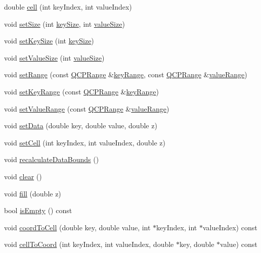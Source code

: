 \begin{DoxyCompactItemize}
double \hyperlink{class_q_c_p_color_map_data_af51ecd21f347adbf87b4cce4e1f5cbd6}{cell} (int key\+Index, int value\+Index)
\item 
void \hyperlink{class_q_c_p_color_map_data_a0d9ff35c299d0478b682bfbcdd9c097e}{set\+Size} (int \hyperlink{class_q_c_p_color_map_data_aa8d7811686fdfea964947715210c4af8}{key\+Size}, int \hyperlink{class_q_c_p_color_map_data_ab880be6bc587f34e8d22fe77ef6b57e9}{value\+Size})
\item 
void \hyperlink{class_q_c_p_color_map_data_ac7ef70e383aface34b44dbde49234b6b}{set\+Key\+Size} (int \hyperlink{class_q_c_p_color_map_data_aa8d7811686fdfea964947715210c4af8}{key\+Size})
\item 
void \hyperlink{class_q_c_p_color_map_data_a0893c9e3914513048b45e3429ffd16f2}{set\+Value\+Size} (int \hyperlink{class_q_c_p_color_map_data_ab880be6bc587f34e8d22fe77ef6b57e9}{value\+Size})
\item 
void \hyperlink{class_q_c_p_color_map_data_aad9c1c7c703c1339489fc730517c83d4}{set\+Range} (const \hyperlink{class_q_c_p_range}{Q\+C\+P\+Range} \&\hyperlink{class_q_c_p_color_map_data_a4765180639742460f64ab6c97c745c08}{key\+Range}, const \hyperlink{class_q_c_p_range}{Q\+C\+P\+Range} \&\hyperlink{class_q_c_p_color_map_data_a025be4d7ba0494fd7b38a5a56c737f2a}{value\+Range})
\item 
void \hyperlink{class_q_c_p_color_map_data_a0738c485f3c9df9ea1241b7a8bb6a86e}{set\+Key\+Range} (const \hyperlink{class_q_c_p_range}{Q\+C\+P\+Range} \&\hyperlink{class_q_c_p_color_map_data_a4765180639742460f64ab6c97c745c08}{key\+Range})
\item 
void \hyperlink{class_q_c_p_color_map_data_ada1b2680ba96a5f4175b6d341cf75d23}{set\+Value\+Range} (const \hyperlink{class_q_c_p_range}{Q\+C\+P\+Range} \&\hyperlink{class_q_c_p_color_map_data_a025be4d7ba0494fd7b38a5a56c737f2a}{value\+Range})
\item 
void \hyperlink{class_q_c_p_color_map_data_afd2083ccfd6987ec94aa7ef8e91ca39a}{set\+Data} (double key, double value, double z)
\item 
void \hyperlink{class_q_c_p_color_map_data_a8e75eaf8746596319032a93f3d2d0683}{set\+Cell} (int key\+Index, int value\+Index, double z)
\item 
void \hyperlink{class_q_c_p_color_map_data_ab235ade8a4d64bd3adb26a99b3dd57ee}{recalculate\+Data\+Bounds} ()
\item 
void \hyperlink{class_q_c_p_color_map_data_a9910ba830e96955bd5c8e5bef1e77ef3}{clear} ()
\item 
void \hyperlink{class_q_c_p_color_map_data_a350f783260eb9b5de5c7b5e0d5d3e3c2}{fill} (double z)
\item 
bool \hyperlink{class_q_c_p_color_map_data_a986009324aee1fc5f696db46bd03dde5}{is\+Empty} () const 
\item 
void \hyperlink{class_q_c_p_color_map_data_a26e33c5ec7094b60136350bcd77d3737}{coord\+To\+Cell} (double key, double value, int $\ast$key\+Index, int $\ast$value\+Index) const 
\item 
void \hyperlink{class_q_c_p_color_map_data_ac96d6e84befe7b9951b5da6d4d4a2a47}{cell\+To\+Coord} (int key\+Index, int value\+Index, double $\ast$key, double $\ast$value) const 
\end{DoxyCompactItemize}
